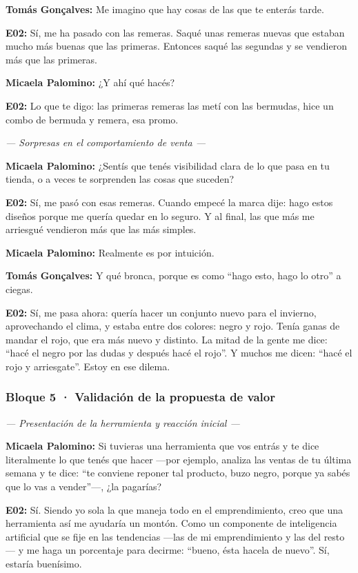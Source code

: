 \noindent\textbf{Tomás Gonçalves:} Me imagino que hay cosas de las que te enterás tarde.

\noindent\textbf{E02:} Sí, me ha pasado con las remeras. Saqué unas remeras nuevas que estaban mucho más buenas que las primeras. Entonces saqué las segundas y se vendieron más que las primeras.

\noindent\textbf{Micaela Palomino:} ¿Y ahí qué hacés?

\noindent\textbf{E02:} Lo que te digo: las primeras remeras las metí con las bermudas, hice un combo de bermuda y remera, esa promo.

\noindent\textit{--- Sorpresas en el comportamiento de venta ---}

\noindent\textbf{Micaela Palomino:} ¿Sentís que tenés visibilidad clara de lo que pasa en tu tienda, o a veces te sorprenden las cosas que suceden?

\noindent\textbf{E02:} Sí, me pasó con esas remeras. Cuando empecé la marca dije: hago estos diseños porque me quería quedar en lo seguro. Y al final, las que más me arriesgué vendieron más que las más simples.

\noindent\textbf{Micaela Palomino:} Realmente es por intuición.

\noindent\textbf{Tomás Gonçalves:} Y qué bronca, porque es como ``hago esto, hago lo otro'' a ciegas.

\noindent\textbf{E02:} Sí, me pasa ahora: quería hacer un conjunto nuevo para el invierno, aprovechando el clima, y estaba entre dos colores: negro y rojo. Tenía ganas de mandar el rojo, que era más nuevo y distinto. La mitad de la gente me dice: ``hacé el negro por las dudas y después hacé el rojo''. Y muchos me dicen: ``hacé el rojo y arriesgate''. Estoy en ese dilema.

\subsubsection*{Bloque 5 · Validación de la propuesta de valor}

\noindent\textit{--- Presentación de la herramienta y reacción inicial ---}

\noindent\textbf{Micaela Palomino:} Si tuvieras una herramienta que vos entrás y te dice literalmente lo que tenés que hacer ---por ejemplo, analiza las ventas de tu última semana y te dice: ``te conviene reponer tal producto, buzo negro, porque ya sabés que lo vas a vender''---, ¿la pagarías?

\noindent\textbf{E02:} Sí. Siendo yo sola la que maneja todo en el emprendimiento, creo que una herramienta así me ayudaría un montón. Como un componente de inteligencia artificial que se fije en las tendencias ---las de mi emprendimiento y las del resto--- y me haga un porcentaje para decirme: ``bueno, ésta hacela de nuevo''. Sí, estaría buenísimo.

